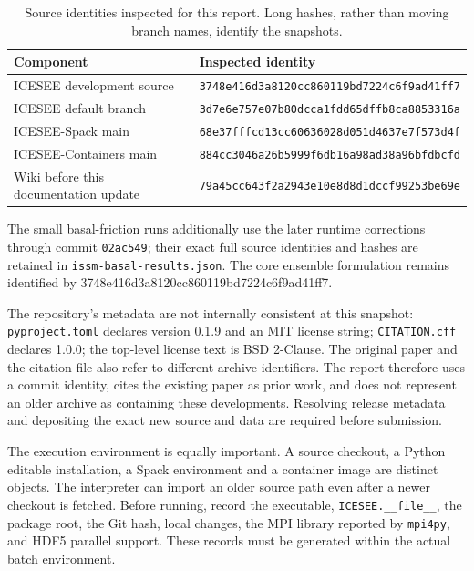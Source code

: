 \documentclass[11pt,a4paper]{article}
\newcommand{\code}[1]{\nolinkurl{#1}}
\newcommand{\revision}{3748e416d3a8120cc860119bd7224c6f9ad41ff7}
\begin{document}
\begin{table}[htbp]\centering\small
\caption{Source identities inspected for this report. Long hashes, rather than moving branch names, identify the snapshots.}\label{tab:source}
\begin{tabular}{p{.25\linewidth}p{.68\linewidth}}\toprule
Component & Inspected identity\\\midrule
ICESEE development source & \code{3748e416d3a8120cc860119bd7224c6f9ad41ff7}\\
ICESEE default branch & \code{3d7e6e757e07b80dcca1fdd65dffb8ca8853316a}\\
ICESEE-Spack main & \code{68e37fffcd13cc60636028d051d4637e7f573d4f}\\
ICESEE-Containers main & \code{884cc3046a26b5999f6db16a98ad38a96bfdbcfd}\\
Wiki before this documentation update & \code{79a45cc643f2a2943e10e8d8d1dccf99253be69e}\\\bottomrule
\end{tabular}
\end{table}

The small basal-friction runs additionally use the later runtime corrections through commit \code{02ac549}; their exact full source identities and hashes are retained in \code{issm-basal-results.json}. The core ensemble formulation remains identified by \revision.

The repository's metadata are not internally consistent at this snapshot: \code{pyproject.toml} declares version 0.1.9 and an MIT license string; \code{CITATION.cff} declares 1.0.0; the top-level license text is BSD 2-Clause. The original paper and the citation file also refer to different archive identifiers. The report therefore uses a commit identity, cites the existing paper as prior work, and does not represent an older archive as containing these developments. Resolving release metadata and depositing the exact new source and data are required before submission.

The execution environment is equally important. A source checkout, a Python editable installation, a Spack environment and a container image are distinct objects. The interpreter can import an older source path even after a newer checkout is fetched. Before running, record the executable, \code{ICESEE.__file__}, the package root, the Git hash, local changes, the MPI library reported by \code{mpi4py}, and HDF5 parallel support. These records must be generated within the actual batch environment.
\end{document}
